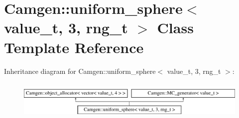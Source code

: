 \hypertarget{a00569}{}\section{Camgen\+:\+:uniform\+\_\+sphere$<$ value\+\_\+t, 3, rng\+\_\+t $>$ Class Template Reference}
\label{a00569}
Inheritance diagram for Camgen\+:\+:uniform\+\_\+sphere$<$ value\+\_\+t, 3, rng\+\_\+t $>$\+:\begin{figure}[H]
\begin{center}
\leavevmode
\includegraphics[height=1.848185cm]{a00569}
\end{center}
\end{figure}
